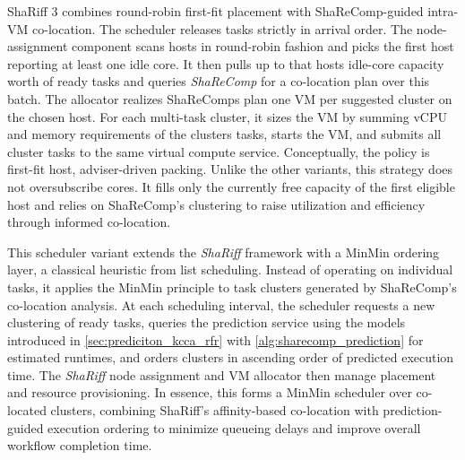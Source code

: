 ShaRiff 3 combines round-robin first-fit placement with ShaReComp-guided intra-VM co-location. The scheduler releases tasks strictly in arrival order. The node-assignment component scans hosts in round-robin fashion and picks the first host reporting at least one idle core. It then pulls up to that hosts idle-core capacity worth of ready tasks and queries \textit{ShaReComp} for a co-location plan over this batch.
The allocator realizes ShaReComps plan one VM per suggested cluster on the chosen host. For each multi-task cluster, it sizes the VM by summing vCPU and memory requirements of the clusters tasks, starts the VM, and submits all cluster tasks to the same virtual compute service.
Conceptually, the policy is first-fit host, adviser-driven packing. Unlike the other variants, this strategy does not oversubscribe cores. It fills only the currently free capacity of the first eligible host and relies on ShaReComp's clustering to raise utilization and efficiency through informed co-location.

This scheduler variant extends the \textit{ShaRiff} framework with a MinMin ordering layer, a classical heuristic from list scheduling. Instead of operating on individual tasks, it applies the MinMin principle to task clusters generated by ShaReComp's co-location analysis. At each scheduling interval, the scheduler requests a new clustering of ready tasks, queries the prediction service using the models introduced in \ref{sec:prediciton_kcca_rfr} with \ref{alg:sharecomp_prediction} for estimated runtimes, and orders clusters in ascending order of predicted execution time. The \textit{ShaRiff} node assignment and VM allocator then manage placement and resource provisioning. In essence, this forms a MinMin scheduler over co-located clusters, combining ShaRiff's affinity-based co-location with prediction-guided execution ordering to minimize queueing delays and improve overall workflow completion time.

